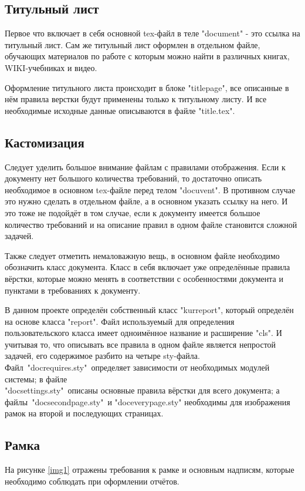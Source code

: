	\subsection{Титульный лист}
		Первое что включает в себя основной  tex-файл  в теле "document" - это ссылка на титульный лист. Сам же титульный лист оформлен в отдельном файле,
		обучающих материалов по работе с которым можно найти в различных книгах, WIKI-учебниках и видео.

		Оформление титульного листа происходит в блоке "titlepage", все описанные в нём правила верстки будут применены только к титульному листу. 
		И все необходимые исходные данные описываются в файле "title.tex".

	\subsection{Кастомизация}
		Следует уделить большое внимание файлам с правилами отображения. Если к документу нет большого количества требований, то достаточно описать
		необходимое в основном tex-файле перед телом "docuvent". В противном случае это нужно сделать в отдельном файле, а в основном указать ссылку на него.
		И это тоже не подойдёт в том случае, если к документу имеется большое количество требований и на описание правил в одном файле становится сложной задачей.

		
		Также следует отметить немаловажную вещь, в основном файле необходимо обозначить класс документа. Класс в себя включает уже определённые правила вёрстки,
		которые можно менять в соответствии с особенностями документа и пунктами в требованиях к документу.

		В данном проекте определён собственный класс "kurreport", который определён на основе класса "report". Файл используемый для определения пользовательского
		класса имеет одноимённое название и расширение "cls". И учитывая то, что описывать все правила в одном файле является непростой задачей, его содержимое разбито
		на четыре sty-файла. Файл\ "docrequires.sty"\ определяет зависимости от необходимых модулей системы; в файле\\ "docsettings.sty"\ описаны основные правила вёрстки
		для всего документа; а файлы\ "docsecondpage.sty"\ и "doceverypage.sty" необходимы для изображения рамок на второй и последующих страницах.
	\subsection{Рамка}

		На рисунке \ref{img1} отражены требования к рамке и основным надписям, которые необходимо соблюдать при оформлении отчётов.

